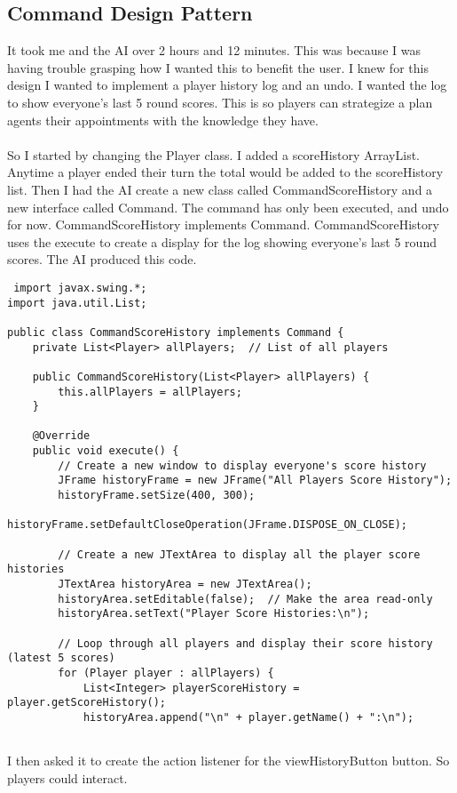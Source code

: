 \documentclass[a4paper,11pt]{article}
\begin{document}
\subsection{Command Design Pattern}
It took me and the AI over 2 hours and 12 minutes. This was because I was having trouble grasping how I wanted this to benefit the user. I knew for this design I wanted to implement a player history log and an undo. I wanted the log to show everyone's last 5 round scores. This is so players can strategize a plan agents their appointments with the knowledge they have.\\\\ 
So I started by changing the Player class. I added a scoreHistory ArrayList. Anytime a player ended their turn the total would be added to the scoreHistory list. Then I had the AI create a new class called CommandScoreHistory and a new interface called Command. The command has only been executed, and undo for now. CommandScoreHistory implements Command. CommandScoreHistory uses the execute to create a display for the log showing everyone's last 5 round scores. The AI produced this code.
 \begin{lstlisting}
 import javax.swing.*;
import java.util.List;

public class CommandScoreHistory implements Command {
    private List<Player> allPlayers;  // List of all players

    public CommandScoreHistory(List<Player> allPlayers) {
        this.allPlayers = allPlayers;
    }

    @Override
    public void execute() {
        // Create a new window to display everyone's score history
        JFrame historyFrame = new JFrame("All Players Score History");
        historyFrame.setSize(400, 300);
        historyFrame.setDefaultCloseOperation(JFrame.DISPOSE_ON_CLOSE);
        
        // Create a new JTextArea to display all the player score histories
        JTextArea historyArea = new JTextArea();
        historyArea.setEditable(false);  // Make the area read-only
        historyArea.setText("Player Score Histories:\n");

        // Loop through all players and display their score history (latest 5 scores)
        for (Player player : allPlayers) {
            List<Integer> playerScoreHistory = player.getScoreHistory();
            historyArea.append("\n" + player.getName() + ":\n");
   
 \end{lstlisting}
I then asked it to create the action listener for the viewHistoryButton button. So players could interact. 
\end{document}

